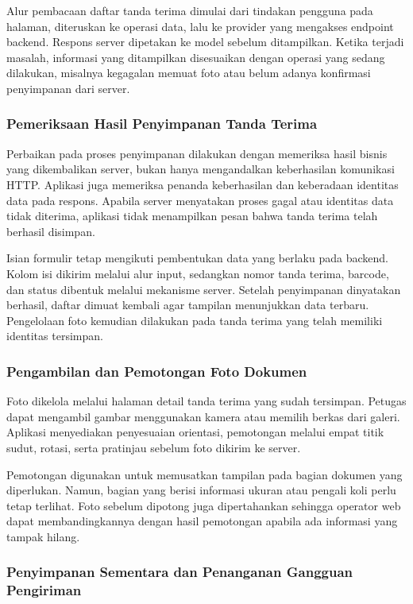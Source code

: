 Alur pembacaan daftar tanda terima dimulai dari tindakan pengguna pada halaman, diteruskan ke operasi data, lalu ke provider yang mengakses endpoint backend. Respons server dipetakan ke model sebelum ditampilkan. Ketika terjadi masalah, informasi yang ditampilkan disesuaikan dengan operasi yang sedang dilakukan, misalnya kegagalan memuat foto atau belum adanya konfirmasi penyimpanan dari server.

\subsubsection{Pemeriksaan Hasil Penyimpanan Tanda Terima}

Perbaikan pada proses penyimpanan dilakukan dengan memeriksa hasil bisnis yang dikembalikan server, bukan hanya mengandalkan keberhasilan komunikasi HTTP. Aplikasi juga memeriksa penanda keberhasilan dan keberadaan identitas data pada respons. Apabila server menyatakan proses gagal atau identitas data tidak diterima, aplikasi tidak menampilkan pesan bahwa tanda terima telah berhasil disimpan.

Isian formulir tetap mengikuti pembentukan data yang berlaku pada backend. Kolom isi dikirim melalui alur input, sedangkan nomor tanda terima, barcode, dan status dibentuk melalui mekanisme server. Setelah penyimpanan dinyatakan berhasil, daftar dimuat kembali agar tampilan menunjukkan data terbaru. Pengelolaan foto kemudian dilakukan pada tanda terima yang telah memiliki identitas tersimpan.

\subsubsection{Pengambilan dan Pemotongan Foto Dokumen}

Foto dikelola melalui halaman detail tanda terima yang sudah tersimpan. Petugas dapat mengambil gambar menggunakan kamera atau memilih berkas dari galeri. Aplikasi menyediakan penyesuaian orientasi, pemotongan melalui empat titik sudut, rotasi, serta pratinjau sebelum foto dikirim ke server.

Pemotongan digunakan untuk memusatkan tampilan pada bagian dokumen yang diperlukan. Namun, bagian yang berisi informasi ukuran atau pengali koli perlu tetap terlihat. Foto sebelum dipotong juga dipertahankan sehingga operator web dapat membandingkannya dengan hasil pemotongan apabila ada informasi yang tampak hilang.

\subsubsection{Penyimpanan Sementara dan Penanganan Gangguan Pengiriman}

